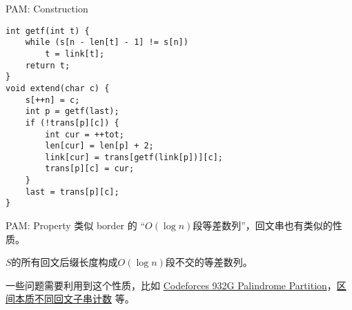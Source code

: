 \documentclass{beamer}
\theoremstyle{compact}
\begin{document}
\begin{frame}[fragile]{PAM: Construction}
	\begin{verbatim}
int getf(int t) {
    while (s[n - len[t] - 1] != s[n])
        t = link[t];
    return t;
}
void extend(char c) {
    s[++n] = c;
    int p = getf(last);
    if (!trans[p][c]) {
        int cur = ++tot;
        len[cur] = len[p] + 2;
        link[cur] = trans[getf(link[p])][c];
        trans[p][c] = cur;
    }
    last = trans[p][c];
}
	\end{verbatim}
\end{frame}
\begin{frame}{PAM: Property}
	类似 border 的 “$O(\log n)$段等差数列”，回文串也有类似的性质。
	
	\begin{lemma}
		$S$的所有回文后缀长度构成$O(\log n)$段不交的等差数列。
	\end{lemma}

	一些问题需要利用到这个性质，比如 \href{http://codeforces.com/problemset/problem/932/G}{Codeforces 932G Palindrome Partition}，\href{https://loj.ac/p/6070}{区间本质不同回文子串计数} 等。
\end{frame}
\end{document}
